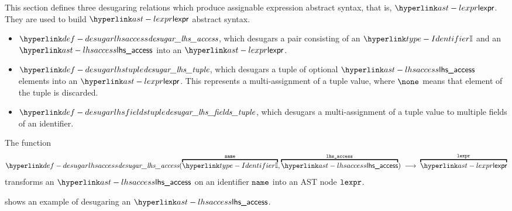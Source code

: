 This section defines three desugaring relations which produce assignable expression abstract syntax, that is, $\lexpr$.
They are used to build $\lexpr$ abstract syntax.
\begin{itemize}
  \item $\desugarlhsaccess$, which desugars a pair consisting of an $\Identifier$ and an $\lhsaccess$ into an $\lexpr$.
  \item $\desugarlhstuple$, which desugars a tuple of optional $\lhsaccess$ elements into an $\lexpr$.
        This represents a multi-assignment of a tuple value, where $\none$ means that element of the tuple is discarded.
  \item $\desugarlhsfieldstuple$, which desugars a multi-assignment of a tuple value to multiple fields of an identifier.
\end{itemize}

\hypertarget{def-desugarlhsaccess}{}
The function
\[
  \desugarlhsaccess(\overname{\Identifier}{\name}, \overname{\lhsaccess}{\vlhsaccess}) \;\aslto\; \overname{\lexpr}{\vlexpr}
\]
transforms an $\lhsaccess$ on an identifier $\texttt{name}$ into an AST node $\texttt{lexpr}$.

 shows an example of desugaring an $\lhsaccess$.

\begin{mathpar}
\end{mathpar}

